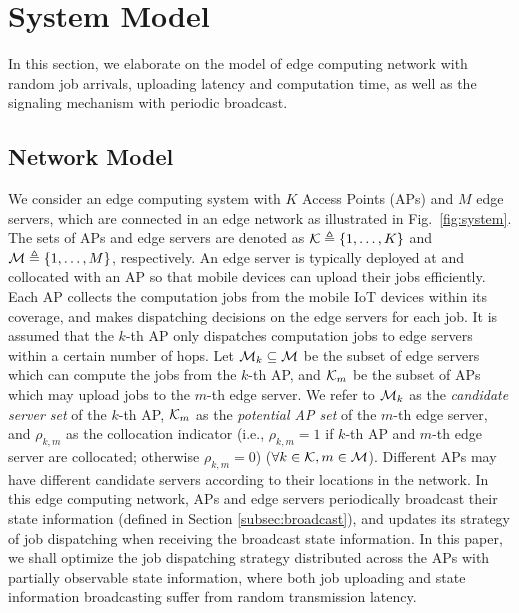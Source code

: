 \section{System Model}
\label{sec:model}
In this section, we elaborate on the model of edge computing network with random job arrivals, uploading latency and computation time, as well as the signaling mechanism with periodic broadcast.
\subsection{Network Model}
We consider an edge computing system with $K$ Access Points (APs) and $M$ edge servers, which are connected in an edge network as illustrated in Fig.~\ref{fig:system}.
The sets of APs and edge servers are denoted as $\mathcal{K} \triangleq \{1,\dots,K\}$ and $\mathcal{M} \triangleq \{1,\dots,M\}$, respectively.
An edge server is typically deployed at and collocated with an AP so that mobile devices can upload their jobs efficiently.
Each AP collects the computation jobs from the {mobile IoT devices} within its coverage, and makes dispatching {decisions} on the edge servers for each job.
It is assumed that the $k$-th AP only dispatches computation jobs to edge servers within a certain number of hops.
Let $\mathcal{M}_{k} \subseteq \mathcal{M}$ be the subset of edge servers which can compute the jobs from the $k$-th AP, and $\mathcal{K}_{m}$ be the subset of APs which may upload jobs to the $m$-th edge server.
We refer to $\mathcal{M}_{k}$ as the \emph{candidate server set} of the $k$-th AP, $\mathcal{K}_{m}$ as the \emph{potential AP set} of the $m$-th edge server, and $\rho_{k,m}$ as the collocation indicator (i.e., $\rho_{k,m}=1$ if $k$-th AP and $m$-th edge server are collocated; otherwise $\rho_{k,m}=0$) ($\forall k\in\mathcal{K}, m\in\mathcal{M}$).
Different APs may have different candidate servers according to their locations in the network.
In this edge computing network, APs and edge servers periodically broadcast their state information (defined in Section \ref{subsec:broadcast}), and  updates its strategy of job dispatching when receiving the broadcast state information.
In this paper, we shall optimize the job dispatching strategy distributed across the APs with partially observable state information, where both job uploading and state information broadcasting suffer from random transmission latency.

